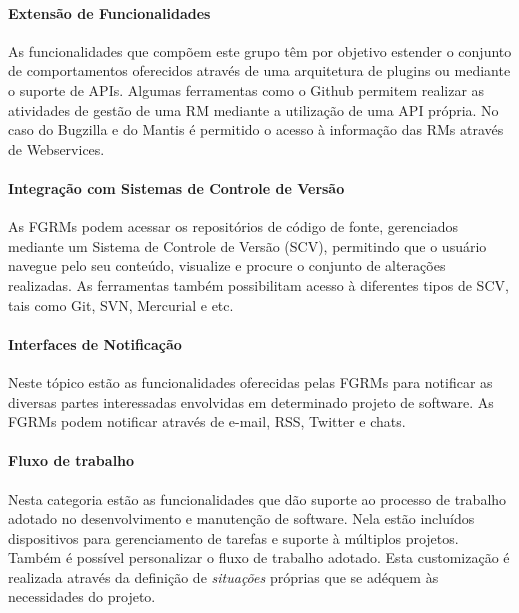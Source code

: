\paragraph{Extensão de Funcionalidades}
\label{par:extensão_de_funcionalidades}

As funcionalidades que compõem este grupo têm por objetivo estender o conjunto
de comportamentos oferecidos através de uma arquitetura de plugins ou mediante o
suporte de APIs. Algumas ferramentas como o Github permitem realizar as
atividades de gestão de uma RM mediante a utilização de uma API própria. No caso
do Bugzilla e do Mantis é permitido o acesso à informação das RMs através de
Webservices.

\paragraph{Integração com Sistemas de Controle de Versão}
\label{par:integração_com_sistemas_de_controle_de_versão}

As FGRMs podem acessar os repositórios de código de fonte, gerenciados mediante
um Sistema de Controle de Versão (SCV), permitindo que o usuário navegue pelo
seu conteúdo, visualize e procure o conjunto de alterações realizadas. As
ferramentas também possibilitam acesso à diferentes tipos de SCV, tais como Git,
SVN, Mercurial e etc.

\paragraph{Interfaces de Notificação}
\label{par:interfaces_de_notificação}

Neste tópico estão as funcionalidades oferecidas pelas FGRMs para notificar as
diversas partes interessadas envolvidas em determinado projeto de software. As
FGRMs podem notificar através de e-mail, RSS, Twitter e chats.

\paragraph{Fluxo de trabalho}
\label{par:fluxo_de_trabalho}

Nesta categoria estão as funcionalidades que dão suporte ao processo de trabalho
adotado no desenvolvimento e manutenção de software. Nela estão incluídos
dispositivos para gerenciamento de tarefas e suporte à múltiplos projetos.
Também é possível personalizar o fluxo de trabalho adotado. Esta customização é
realizada através da definição de \textit{situações} próprias que se adéquem às
necessidades do projeto.

